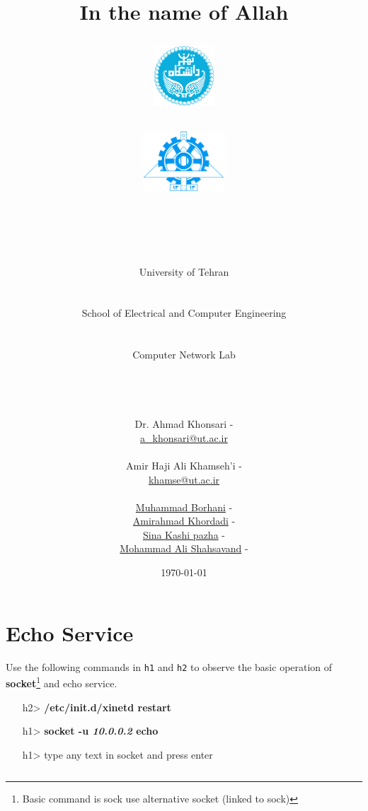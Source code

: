 \documentclass[10pt,a4paper]{article}
\title{
\normalsize In the name of Allah\\
\vspace{10pt}
\LARGE\FR{بسم \allah\  الرحمن الرحیم}
\vspace{10pt}
\begin{center}
	\begin{minipage}{0.48\textwidth} \begin{flushleft}
			\includegraphics[height=64pt,width=64pt]{../img/logo.png}
	\end{flushleft}\end{minipage}
	\begin{minipage}{0.48\textwidth} \begin{flushright}
			\includegraphics[height=64pt]{../img/eng-logo.png}
	\end{flushright}\end{minipage}
\end{center}
\vspace*{-64pt}
	\huge \titleText\\
\vspace{40pt}
}
\author{
	\huge University of Tehran\\
    \LARGE \FR{دانشگاه تهران}\\\\
    \LARGE School of Electrical and Computer Engineering\\
    \FR{دانشکده مهندسی برق و کامپیوتر}\\\\
    \Large Computer Network Lab\\
    \FR{آزمایشگاه شبکه‌های کامپیوتری}\\\\\\\\
    \normalfont
    Dr. Ahmad Khonsari - \FR{احمد خونساری}\\
    \href{mailto:a_khonsari@ut.ac.ir}{a\_khonsari@ut.ac.ir}\\\\
    \normalsize
    Amir Haji Ali Khamseh'i - \FR{امیر حاجی علی خمسه‌ء}\\
    \href{mailto:khamse@ut.ac.ir}{khamse@ut.ac.ir}\\\\
    \normalsize \href{mailto:m.borhani@ut.ac.ir}{Muhammad Borhani} - \FR{محمد برهانی}\\
	\normalsize \href{mailto:a.a.khordadi@ut.ac.ir}{Amirahmad Khordadi} - \FR{امیر احمد خردادی}\\
	\normalsize \href{mailto:sina\_kashipazha@ut.ac.ir}{Sina Kashi pazha} - \FR{سینا کاشی پزها}\\
	\normalsize \href{mailto:mashahsavand@ut.ac.ir}{Mohammad Ali Shahsavand} - \FR{محمد علی شاهسوند}
}
\date{\vspace{30pt}\today\\\vspace{10pt}{\selectlanguage{farsi}\today}}
\numberwithin{equation}{section}
\numberwithin{figure}{section}
\numberwithin{table}{section}
\begin{document}

\maketitle


\pagebreak




\section{Echo Service}
Use the following commands in \texttt{h1} and \texttt{h2} to observe the basic operation of \textbf{socket}\footnote{Basic command is sock use alternative socket (linked to sock)} and echo service. \\
\begin{itemize}
	\item [h2>] \textbf{/etc/init.d/xinetd restart}
	\item [h1>] \textbf{socket -u \textit{10.0.0.2} echo}
	\item [h1>]type any text in socket and press enter
\end{itemize}
\begin{lstlisting}[language=bash]
\end{lstlisting}
\end{document}
